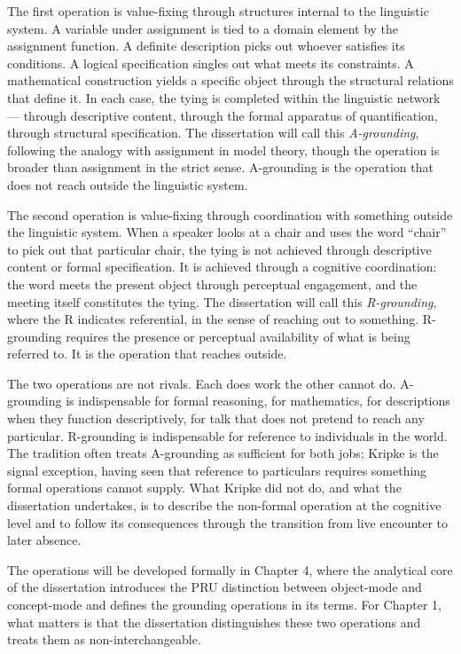 \documentclass[12pt,a4paper]{article}
\begin{document}
The first operation is value-fixing through structures internal to the linguistic system. A variable under assignment is tied to a domain element by the assignment function. A definite description picks out whoever satisfies its conditions. A logical specification singles out what meets its constraints. A mathematical construction yields a specific object through the structural relations that define it. In each case, the tying is completed within the linguistic network --- through descriptive content, through the formal apparatus of quantification, through structural specification. The dissertation will call this \emph{A-grounding}, following the analogy with assignment in model theory, though the operation is broader than assignment in the strict sense. A-grounding is the operation that does not reach outside the linguistic system.

The second operation is value-fixing through coordination with something outside the linguistic system. When a speaker looks at a chair and uses the word ``chair'' to pick out that particular chair, the tying is not achieved through descriptive content or formal specification. It is achieved through a cognitive coordination: the word meets the present object through perceptual engagement, and the meeting itself constitutes the tying. The dissertation will call this \emph{R-grounding}, where the R indicates referential, in the sense of reaching out to something. R-grounding requires the presence or perceptual availability of what is being referred to. It is the operation that reaches outside.

The two operations are not rivals. Each does work the other cannot do. A-grounding is indispensable for formal reasoning, for mathematics, for descriptions when they function descriptively, for talk that does not pretend to reach any particular. R-grounding is indispensable for reference to individuals in the world. The tradition often treats A-grounding as sufficient for both jobs; Kripke is the signal exception, having seen that reference to particulars requires something formal operations cannot supply. What Kripke did not do, and what the dissertation undertakes, is to describe the non-formal operation at the cognitive level and to follow its consequences through the transition from live encounter to later absence.

The operations will be developed formally in Chapter 4, where the analytical core of the dissertation introduces the PRU distinction between object-mode and concept-mode and defines the grounding operations in its terms. For Chapter 1, what matters is that the dissertation distinguishes these two operations and treats them as non-interchangeable.
\end{document}

